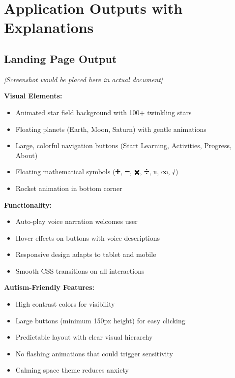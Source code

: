 \documentclass[12pt, a4paper]{article}
\begin{document}
\section{Application Outputs with Explanations}

\subsection{Landing Page Output}

\begin{tcolorbox}[colback=gray!5, colframe=gray!50, title=\textbf{Landing Page Screenshot}]
\textit{[Screenshot would be placed here in actual document]}

\textbf{Visual Elements:}
\begin{itemize}
    \item Animated star field background with 100+ twinkling stars
    \item Floating planets (Earth, Moon, Saturn) with gentle animations
    \item Large, colorful navigation buttons (Start Learning, Activities, Progress, About)
    \item Floating mathematical symbols (➕, ➖, ✖️, ➗, π, ∞, √)
    \item Rocket animation in bottom corner
\end{itemize}

\textbf{Functionality:}
\begin{itemize}
    \item Auto-play voice narration welcomes user
    \item Hover effects on buttons with voice descriptions
    \item Responsive design adapts to tablet and mobile
    \item Smooth CSS transitions on all interactions
\end{itemize}

\textbf{Autism-Friendly Features:}
\begin{itemize}
    \item High contrast colors for visibility
    \item Large buttons (minimum 150px height) for easy clicking
    \item Predictable layout with clear visual hierarchy
    \item No flashing animations that could trigger sensitivity
    \item Calming space theme reduces anxiety
\end{itemize}
\end{tcolorbox}
\end{document}
